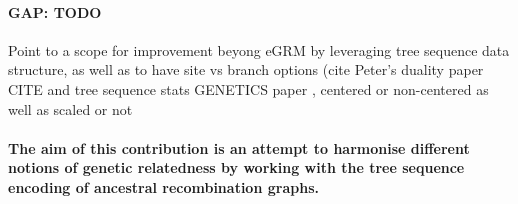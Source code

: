 




\paragraph{GAP: TODO}


Point to a scope for improvement beyong eGRM \citep{fan2022genealogical} by leveraging tree sequence data structure, as well as to have site vs branch options (cite Peter's duality paper CITE and tree sequence stats GENETICS paper \citep{ralph2020efficiently}, centered or non-centered as well as scaled or not


\paragraph{The aim of this contribution is an attempt to harmonise different notions of genetic relatedness by working with the tree sequence encoding of ancestral recombination graphs.}


